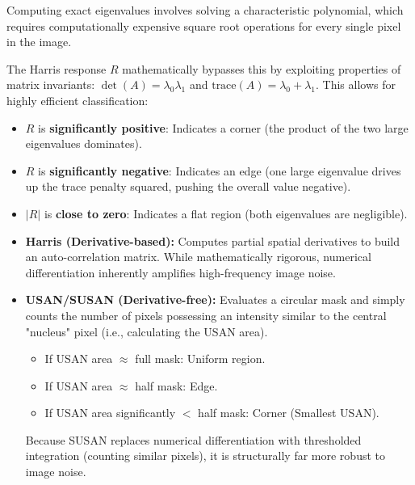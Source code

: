 {Computing exact eigenvalues involves solving a characteristic polynomial, which requires computationally expensive square root operations for every single pixel in the image. 

The Harris response $R$ mathematically bypasses this by exploiting properties of matrix invariants: $\det(A) = \lambda_0 \lambda_1$ and $\text{trace}(A) = \lambda_0 + \lambda_1$. This allows for highly efficient classification:
\begin{itemize}
    \item $R$ is \textbf{significantly positive}: Indicates a corner (the product of the two large eigenvalues dominates).
    \item $R$ is \textbf{significantly negative}: Indicates an edge (one large eigenvalue drives up the trace penalty squared, pushing the overall value negative).
    \item $|R|$ is \textbf{close to zero}: Indicates a flat region (both eigenvalues are negligible).
\end{itemize}
}

{
\begin{itemize}
    \item \textbf{Harris (Derivative-based):} Computes partial spatial derivatives to build an auto-correlation matrix. While mathematically rigorous, numerical differentiation inherently amplifies high-frequency image noise.
    \item \textbf{USAN/SUSAN (Derivative-free):} Evaluates a circular mask and simply counts the number of pixels possessing an intensity similar to the central "nucleus" pixel (i.e., calculating the USAN area). 
    \begin{itemize}
        \item If USAN area $\approx$ full mask: Uniform region.
        \item If USAN area $\approx$ half mask: Edge.
        \item If USAN area significantly $<$ half mask: Corner (Smallest USAN).
    \end{itemize}
    Because SUSAN replaces numerical differentiation with thresholded integration (counting similar pixels), it is structurally far more robust to image noise.
\end{itemize}
}

